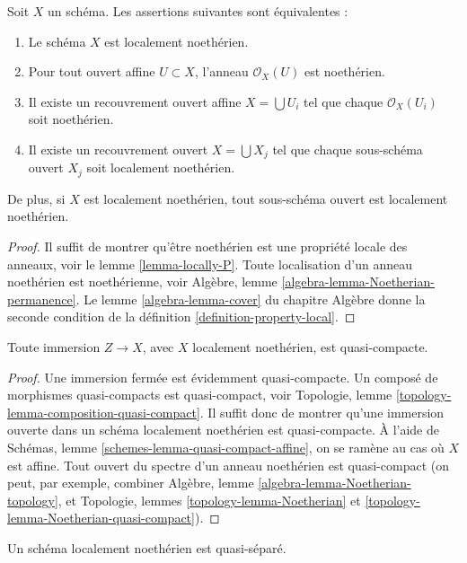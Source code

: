 \begin{lemma}
\label{lemma-locally-Noetherian}
Soit $X$ un schéma. Les assertions suivantes sont équivalentes :
\begin{enumerate}
\item Le schéma $X$ est localement noethérien.
\item Pour tout ouvert affine $U \subset X$, l'anneau $\mathcal{O}_X(U)$
est noethérien.
\item Il existe un recouvrement ouvert affine $X = \bigcup U_i$ tel que
chaque $\mathcal{O}_X(U_i)$ soit noethérien.
\item Il existe un recouvrement ouvert $X = \bigcup X_j$
tel que chaque sous-schéma ouvert $X_j$ soit localement noethérien.
\end{enumerate}
De plus, si $X$ est localement noethérien, tout sous-schéma ouvert
est localement noethérien.
\end{lemma}

\begin{proof}
Il suffit de montrer qu'être noethérien est une propriété locale
des anneaux, voir le lemme \ref{lemma-locally-P}.
Toute localisation d'un anneau noethérien est noethérienne, voir
Algèbre, lemme \ref{algebra-lemma-Noetherian-permanence}.
Le lemme \ref{algebra-lemma-cover} du chapitre Algèbre donne la seconde
condition de la définition \ref{definition-property-local}.
\end{proof}

\begin{lemma}
\label{lemma-immersion-into-noetherian}
Toute immersion $Z \to X$, avec $X$ localement noethérien, est quasi-compacte.
\end{lemma}

\begin{proof}
Une immersion fermée est évidemment quasi-compacte.
Un composé de morphismes quasi-compacts est quasi-compact,
voir Topologie, lemme \ref{topology-lemma-composition-quasi-compact}.
Il suffit donc de montrer qu'une immersion ouverte dans
un schéma localement noethérien est quasi-compacte.
À l'aide de Schémas, lemme \ref{schemes-lemma-quasi-compact-affine},
on se ramène au cas où $X$ est affine.
Tout ouvert du spectre d'un anneau noethérien
est quasi-compact (on peut, par exemple,
combiner Algèbre, lemme \ref{algebra-lemma-Noetherian-topology}, et
Topologie, lemmes \ref{topology-lemma-Noetherian} et
\ref{topology-lemma-Noetherian-quasi-compact}).
\end{proof}

\begin{lemma}
\label{lemma-locally-Noetherian-quasi-separated}
Un schéma localement noethérien est quasi-séparé.
\end{lemma}

